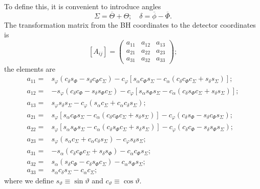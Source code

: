 \documentclass[a4paper, 11pt, titlepage, twoside]{report}
\begin{document}
{\begin{equation}
\end{equation}
To define this, it is convenient to introduce angles
\begin{equation}
\Sigma = \overline{\Theta} + \Theta; \quad \delta = \overline{\phi} - \overline{\Phi}.
\end{equation}
The transformation matrix from the BH coordinates to the detector coordinates is
\begin{equation}
\left[A_{ij}\right] = \begin{pmatrix}
a_{11} & a_{12} & a_{13} \\
a_{21} & a_{22} & a_{23} \\
a_{31} & a_{32} & a_{33}
\end{pmatrix};
\end{equation}
the elements are
\begin{align}
a_{11} = {} & s_\varphi\left(c_\delta s_\Phi - s_\delta c_\Phi c_\Sigma\right) - c_\varphi \left[s_\alpha c_\Phi s_\Sigma - c_\alpha \left(c_\delta c_\Phi c_\Sigma + s_\delta s_\Sigma\right)\right]; \\
a_{12} = {} & -s_\varphi\left(c_\delta c_\Phi - s_\delta s_\Phi c_\Sigma\right) - c_\varphi \left[s_\alpha s_\Phi s_\Sigma - c_\alpha \left(c_\delta s_\Phi c_\Sigma + s_\delta s_\Sigma\right)\right]; \\
a_{13} = {} & s_\varphi s_\delta s_\Sigma - c_\varphi\left(s_\alpha c_\Sigma + c_\alpha c_\delta s_\Sigma\right); \\
a_{21} = {} & s_\varphi\left[s_\alpha c_\Phi s_\Sigma - c_\alpha \left(c_\delta c_\Phi c_\Sigma + s_\delta s_\Sigma\right)\right] - c_\varphi \left(c_\delta s_\Phi - s_\delta c_\Phi s_\Sigma\right); \\
a_{22} = {} & s_\varphi\left[s_\alpha s_\Phi s_\Sigma - c_\alpha \left(c_\delta s_\Phi c_\Sigma + s_\delta s_\Sigma\right)\right] - c_\varphi \left(c_\delta c_\Phi - s_\delta s_\Phi s_\Sigma\right); \\
a_{23} = {} & s_\varphi\left(s_\alpha c_\Sigma + c_\alpha c_\delta s_\Sigma\right) - c_\varphi s_\delta s_\Sigma; \\
a_{31} = {} & -s_\alpha\left(c_\delta c_\Phi c_\Sigma + s_\delta s_\Phi\right) - c_\alpha c_\Phi s_\Sigma; \\
a_{32} = {} & s_\alpha\left(s_\delta c_\Phi - c_\delta s_\Phi c_\Sigma\right) - c_\alpha s_\Phi s_\Sigma; \\
a_{33} = {} & s_\alpha c_\delta s_\Sigma - c_\alpha c_\Sigma;
\end{align}
where we define $s_\vartheta \equiv \sin \vartheta$ and $c_\vartheta \equiv \cos \vartheta$.

}
\end{document}
